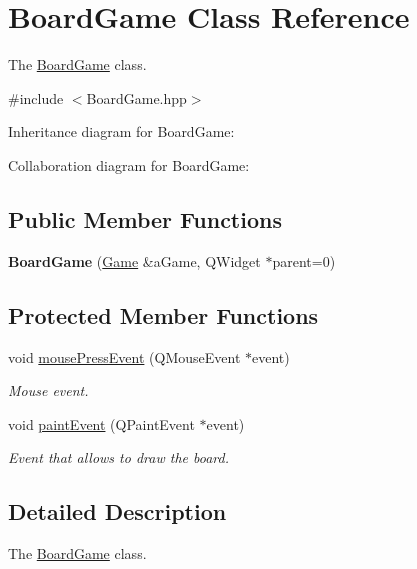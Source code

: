 \hypertarget{class_board_game}{}\section{Board\+Game Class Reference}
\label{class_board_game}


The \hyperlink{class_board_game}{Board\+Game} class.  




{\ttfamily \#include $<$Board\+Game.\+hpp$>$}



Inheritance diagram for Board\+Game\+:


Collaboration diagram for Board\+Game\+:
\subsection*{Public Member Functions}
\begin{DoxyCompactItemize}
\item 
\mbox{\label{class_board_game_a339cc3c58f50d8dedb85762d4f204e7a}} 
{\bfseries Board\+Game} (\hyperlink{class_game}{Game} \&a\+Game, Q\+Widget $\ast$parent=0)
\end{DoxyCompactItemize}
\subsection*{Protected Member Functions}
\begin{DoxyCompactItemize}
\item 
void \hyperlink{class_board_game_a98fa3527ac66267cd04d29c382e00608}{mouse\+Press\+Event} (Q\+Mouse\+Event $\ast$event)
\begin{DoxyCompactList}\small\item\em Mouse event. \end{DoxyCompactList}\item 
void \hyperlink{class_board_game_a070ae1aadf33d752862a71e237281f0c}{paint\+Event} (Q\+Paint\+Event $\ast$event)
\begin{DoxyCompactList}\small\item\em Event that allows to draw the board. \end{DoxyCompactList}\end{DoxyCompactItemize}


\subsection{Detailed Description}
The \hyperlink{class_board_game}{Board\+Game} class. 

